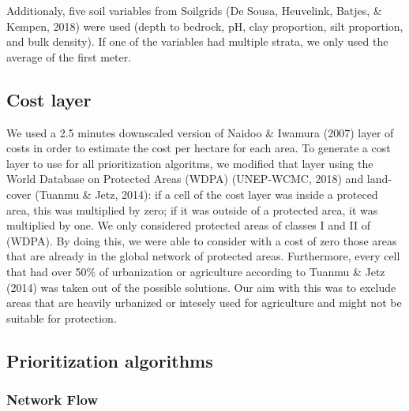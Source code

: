 \documentclass[]{article}
\begin{document}
Additionaly, five soil variables from Soilgrids (De Sousa, Heuvelink, Batjes, \& Kempen, 2018) were used (depth to bedrock, pH, clay proportion, silt proportion, and bulk density). If one of the variables had multiple strata, we only used the average of the first meter.

\hypertarget{cost-layer}{%
\subsection{Cost layer}\label{cost-layer}}

We used a 2.5 minutes downscaled version of Naidoo \& Iwamura (2007) layer of costs in order to estimate the cost per hectare for each area. To generate a cost layer to use for all prioritization algoritms, we modified that layer using the World Database on Protected Areas (WDPA) (UNEP-WCMC, 2018) and land-cover (Tuanmu \& Jetz, 2014): if a cell of the cost layer was inside a proteced area, this was multiplied by zero; if it was outside of a protected area, it was multiplied by one. We only considered protected areas of classes I and II of (WDPA). By doing this, we were able to consider with a cost of zero those areas that are already in the global network of protected areas. Furthermore, every cell that had over 50\% of urbanization or agriculture according to Tuanmu \& Jetz (2014) was taken out of the possible solutions. Our aim with this was to exclude areas that are heavily urbanized or intesely used for agriculture and might not be suitable for protection.

\hypertarget{prioritization-algorithms}{%
\subsection{Prioritization algorithms}\label{prioritization-algorithms}}

\hypertarget{network-flow}{%
\subsubsection{Network Flow}\label{network-flow}}
\end{document}
